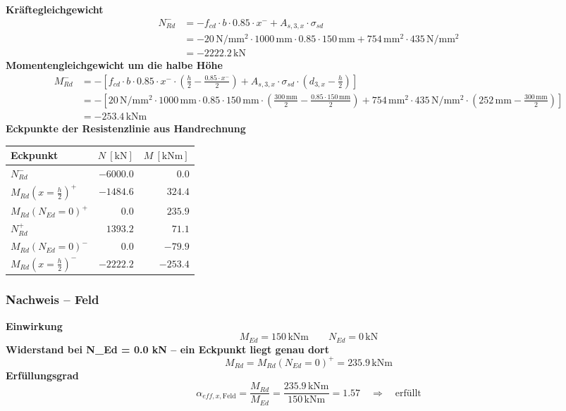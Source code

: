 \documentclass[11pt,a4paper]{article}
\begin{document}
\noindent\textbf{Kräftegleichgewicht}
\begin{equation*}
\begin{aligned}
  N_{Rd}^{-} &= -f_{cd} \cdot b \cdot 0.85 \cdot x^{-} + A_{s,3,x} \cdot \sigma_{sd} \\
  &= -20\,\mathrm{N}/\mathrm{mm}^{2} \cdot 1000\,\mathrm{mm} \cdot 0.85 \cdot 150\,\mathrm{mm} + 754\,\mathrm{mm}^{2} \cdot 435\,\mathrm{N}/\mathrm{mm}^{2} \\
  &= -2222.2\,\mathrm{kN}
\end{aligned}
\end{equation*}
\noindent\textbf{Momentengleichgewicht um die halbe Höhe}
\begin{equation*}
\begin{aligned}
  M_{Rd}^{-} &= -\left[f_{cd} \cdot b \cdot 0.85 \cdot x^{-} \cdot \left(\tfrac{h}{2} - \tfrac{0.85 \cdot x^{-}}{2}\right) + A_{s,3,x} \cdot \sigma_{sd} \cdot \left(d_{3,x} - \tfrac{h}{2}\right)\right] \\
  &= -\left[20\,\mathrm{N}/\mathrm{mm}^{2} \cdot 1000\,\mathrm{mm} \cdot 0.85 \cdot 150\,\mathrm{mm} \cdot \left(\tfrac{300\,\mathrm{mm}}{2} - \tfrac{0.85 \cdot 150\,\mathrm{mm}}{2}\right) + 754\,\mathrm{mm}^{2} \cdot 435\,\mathrm{N}/\mathrm{mm}^{2} \cdot \left(252\,\mathrm{mm} - \tfrac{300\,\mathrm{mm}}{2}\right)\right] \\
  &= -253.4\,\mathrm{kNm}
\end{aligned}
\end{equation*}
\noindent\textbf{Eckpunkte der Resistenzlinie aus Handrechnung}
\begin{longtable}{lrr}
\hline
Eckpunkt & $N\ [\mathrm{kN}]$ & $M\ [\mathrm{kNm}]$ \\
\hline
\endhead
$N_{Rd}^{-}$ & $-6000.0$ & $0.0$ \\
$M_{Rd}(x=\tfrac{h}{2})^{+}$ & $-1484.6$ & $324.4$ \\
$M_{Rd}(N_{Ed}=0)^{+}$ & $0.0$ & $235.9$ \\
$N_{Rd}^{+}$ & $1393.2$ & $71.1$ \\
$M_{Rd}(N_{Ed}=0)^{-}$ & $0.0$ & $-79.9$ \\
$M_{Rd}(x=\tfrac{h}{2})^{-}$ & $-2222.2$ & $-253.4$ \\
\hline
\end{longtable}
\subsubsection{Nachweis – Feld}
\noindent\textbf{Einwirkung}
\begin{equation*}
M_{Ed} = 150\,\mathrm{kNm} \qquad N_{Ed} = 0\,\mathrm{kN}
\end{equation*}
\noindent\textbf{Widerstand bei N\_Ed = 0.0 kN – ein Eckpunkt liegt genau dort}
\begin{equation*}
M_{Rd} = M_{Rd}(N_{Ed}=0)^{+} = 235.9\,\mathrm{kNm}
\end{equation*}
\noindent\textbf{Erfüllungsgrad}
\begin{equation*}
\alpha_{eff,x,\text{Feld}} = \frac{M_{Rd}}{M_{Ed}} = \frac{235.9\,\mathrm{kNm}}{150\,\mathrm{kNm}} = 1.57 \quad \Rightarrow \quad \text{erfüllt}
\end{equation*}
\end{document}
